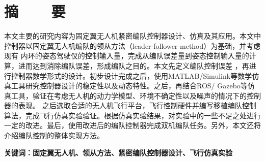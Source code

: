 \topskip=0pt

\vspace*{-7mm}

\begin{center}
  \heiti{}\textbf{\thesisTitle}
\end{center}

\vspace*{2mm}

{\let\clearpage\relax \chapter*{\textmd{摘~~~~要}}}
\setcounter{page}{1}

\vspace*{1mm}

\setlength{\parskip}{0em}

本文主要的研究内容为固定翼无人机紧密编队控制器设计、仿真及其应用。本文中控制器以固定翼无人机编队的领从方法（leader-follower 
method）为基础，并考虑现有
内环的姿态驾驶仪的控制输入量，完成从编队误差量到姿态控制输入量的计算，进而达到消除编队误差，形成编队之目的。本文先定义编队控制误差
，再进行控制器数学形式的设计。初步设计完成之后，使用MATLAB/Simulink等数学仿真工具研究控制器设计的稳定性以及动态特性。之后，再结合ROS/
Gazebo等仿真工具，验证在考虑无人机的动力学模型、环境不确定性以及噪声的情况下的控制器的表现。
之后选取合适的无人机飞行平台，飞行控制硬件并编写移植编队控制算法，完成飞行仿真实验验证。根据仿真实验结果，对实验中的一些不足之处进行
一定的改进。最后，使用改进后的编队控制器完成双机编队任务。另外，本文还将介绍编队控制的整体实现方法。

\vspace{4ex}\noindent\textbf{\heiti 关键词：固定翼无人机、领从方法、紧密编队控制器设计、飞行仿真实验}
\newpage

\topskip=0pt

\vspace*{2mm}

\begin{spacing}{0.95}
  \centering
  \heiti{}\textbf{\thesisTitleEN}
\end{spacing}

